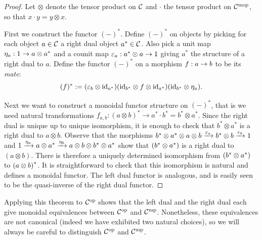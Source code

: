 \documentclass{amsart}
\begin{document}
\begin{proof}
Let $\otimes$ denote the tensor product on $\mathcal C$ and $\cdot$ the tensor product on $\mathcal C^{\mathrm{mop}}$, so that $x \cdot y = y \otimes x$.

First we construct the functor ${(-)^*}$.  Define ${(-)^*}$ on objects by picking for each object $a \in \mathcal C$ a right dual object ${a^*} \in \mathcal C$.  Also pick a unit map $\eta_a: 1 \rightarrow a \otimes {a^*}$ and a counit map  $\varepsilon_a: {a^*} \otimes a \rightarrow 1$  giving ${a^*}$ the structure of a right dual to $a$.  Define the functor ${(-)^*}$ on a morphism $f: a \rightarrow b$ to be its {\em mate}: 
\begin{equation*}
	{(f)^*} := (\varepsilon_b \otimes \mathrm{id}_{{a}^*}) (\mathrm{id}_{{b}^*} \otimes f \otimes \mathrm{id}_{{a}^*}) (\mathrm{id}_{{b}^*} \otimes \eta_a).
\end{equation*}

Next we want to construct a monoidal functor structure on $(-)^*$, that is we need natural transformations $f_{a,b}: (a \otimes b)^* \rightarrow a^* \cdot b^* = b^* \otimes a^*$.  Since the right dual is unique up to unique isomorphism, it is enough to check that $b^* \otimes a^*$ is a right dual to $a \otimes b$.  Observe that the morphisms ${b}^* \otimes {a}^* \otimes a \otimes b \xrightarrow{\varepsilon_a} {b}^* \otimes b \xrightarrow{\varepsilon_b} 1$ and $1 \xrightarrow{\eta_a} a \otimes {a}^* \xrightarrow{\eta_b} a \otimes b \otimes {b}^* \otimes {a}^*$ show that $({b}^* \otimes {a}^*)$ is a right dual to $(a \otimes b)$.  There is therefore a uniquely determined isomorphism from $({b}^* \otimes {a}^*)$ to ${(a \otimes b)}^*$.  It is straightforward to check that this isomorphism is natural and defines a monoidal functor.
The left dual functor is analogous, and is easily seen to be the quasi-inverse of the right dual functor. 
\end{proof}
\begin{remark}
Applying this theorem to $\mathcal C^{\mathrm{op}}$ shows that the left dual and the right dual each give monoidal equivalences between $\mathcal C^{\mathrm{op}}$ and $\mathcal C^{\mathrm{mp}}$.  Nonetheless, these equivalences are not canonical (indeed we have exhibited two natural choices), so we will always be careful to distinguish  $\mathcal C^{\mathrm{op}}$ and $\mathcal C^{\mathrm{mp}}$.
\end{remark}
\end{document}
